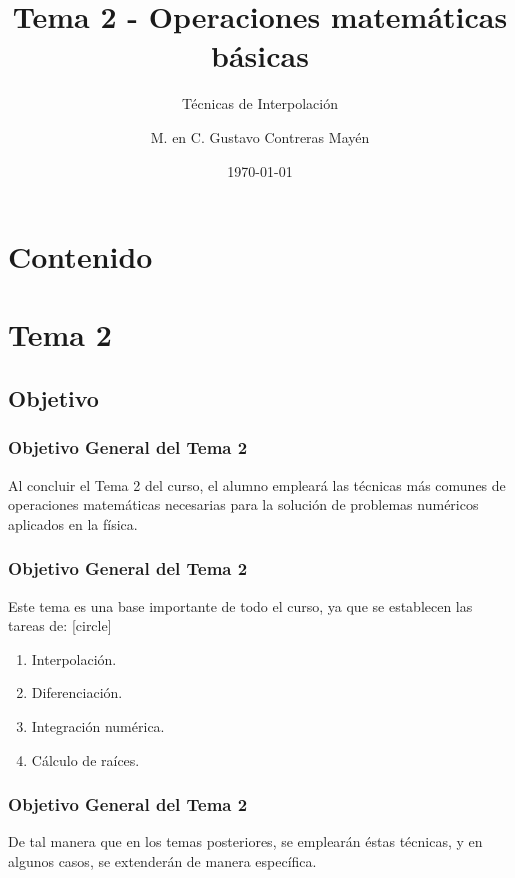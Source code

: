 



\title{\large{Tema 2 - Operaciones matemáticas básicas}}
\subtitle{Técnicas de Interpolación}
\author{M. en C. Gustavo Contreras Mayén}
\date{\today}

\maketitle
\fontsize{14}{14}\selectfont
{}
\section*{Contenido}
\section{Tema 2}
\subsection{Objetivo}
\begin{frame}
\frametitle{Objetivo General del Tema 2}
Al concluir el Tema 2 del curso, el alumno empleará las técnicas más comunes de operaciones matemáticas necesarias para la solución de problemas numéricos aplicados en la física.
\end{frame}
\begin{frame}
\frametitle{Objetivo General del Tema 2}
Este tema es una base importante de todo el curso, ya que se establecen las tareas de:
[circle]
\begin{enumerate}[<+->]
\item Interpolación.
\item Diferenciación.
\item Integración numérica.
\item Cálculo de raíces.
\end{enumerate}
\end{frame}
\begin{frame}
\frametitle{Objetivo General del Tema 2}
De tal manera que en los temas posteriores, se emplearán éstas técnicas, y en algunos casos, se extenderán de manera específica.
\end{frame}
